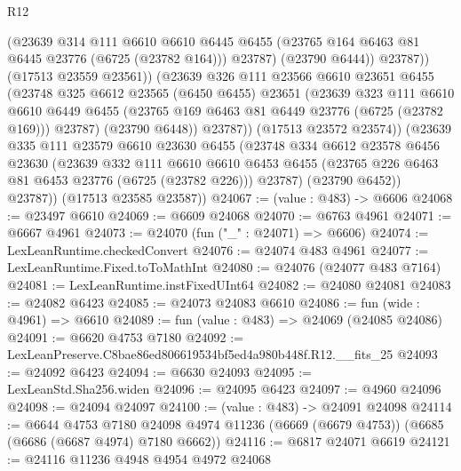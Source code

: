 \begin{lexlean}{R12}
\begin{coremodule}
                    (@23639
                      @314
                      @111
                      @6610
                      @6610
                      @6445
                      @6455
                      (@23765 @164 @6463 @81 @6445 @23776 (@6725 (@23782 @164)))
                      @23787)
                    (@23790 @6444))
                  @23787))
              (@17513 @23559 @23561))
            (@23639
              @326
              @111
              @23566
              @6610
              @23651
              @6455
              (@23748
                @325
                @6612
                @23565
                (@6450 @6455)
                @23651
                (@23639
                  @323
                  @111
                  @6610
                  @6610
                  @6449
                  @6455
                  (@23765 @169 @6463 @81 @6449 @23776 (@6725 (@23782 @169)))
                  @23787)
                (@23790 @6448))
              @23787))
          (@17513 @23572 @23574))
        (@23639
          @335
          @111
          @23579
          @6610
          @23630
          @6455
          (@23748
            @334
            @6612
            @23578
            @6456
            @23630
            (@23639
              @332
              @111
              @6610
              @6610
              @6453
              @6455
              (@23765 @226 @6463 @81 @6453 @23776 (@6725 (@23782 @226)))
              @23787)
            (@23790 @6452))
          @23787))
      (@17513 @23585 @23587))
@24067 := (value : @483) -> @6606
@24068 := @23497 @6610
@24069 := @6609 @24068
@24070 := @6763 @4961
@24071 := @6667 @4961
@24073 := @24070 (fun ("_" : @24071) => @6606)
@24074 := LexLeanRuntime.checkedConvert
@24076 := @24074 @483 @4961
@24077 := LexLeanRuntime.Fixed.toToMathInt
@24080 := @24076 (@24077 @483 @7164)
@24081 := LexLeanRuntime.instFixedUInt64
@24082 := @24080 @24081
@24083 := @24082 @6423
@24085 := @24073 @24083 @6610
@24086 := fun (wide : @4961) => @6610
@24089 := fun (value : @483) => @24069 (@24085 @24086)
@24091 := @6620 @4753 @7180
@24092 := LexLeanPreserve.C8bae86ed806619534bf5ed4a980b448f.R12.__fits_25
@24093 := @24092 @6423
@24094 := @6630 @24093
@24095 := LexLeanStd.Sha256.widen
@24096 := @24095 @6423
@24097 := @4960 @24096
@24098 := @24094 @24097
@24100 := (value : @483) -> @24091 @24098
@24114 := @6644
    @4753
    @7180
    @24098
    @4974
    @11236
    (@6669 (@6679 @4753))
    (@6685 (@6686 (@6687 @4974) @7180 @6662))
@24116 := @6817 @24071 @6619
@24121 := @24116 @11236 @4948 @4954 @4972 @24068

\end{coremodule}
\end{lexlean}
